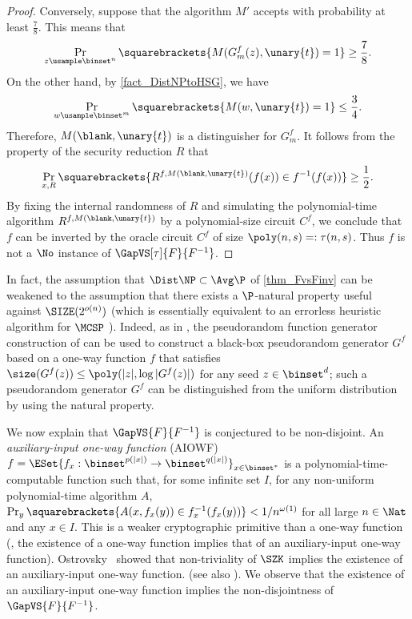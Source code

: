 \documentclass{toc}
\begin{document}
\begin{proof}
  Conversely, suppose that
  the algorithm $M'$ accepts with probability at least $\frac{7}{8}$.
  This means that
  $$
    \Pr_{z \usample \binset^n} \squarebrackets{ M(G^f_{m}(z), \unary{t}) = 1 } \ge \frac{7}{8}.
  $$
  On the other hand, by \cref{fact_DistNPtoHSG}, we have
  $$
    \Pr_{w \usample \binset^m} \squarebrackets{ M(w, \unary{t}) = 1 } \le \frac{3}{4}.
  $$
  Therefore, $M( \blank, \unary{t})$ is a distinguisher for $G_{ m}^f$.
  It follows from the property of the security reduction $R$
  that
  $$
    \Pr_{x, R} \squarebrackets{ R^{f, M(\blank, \unary{t})}(f(x)) \in f^{-1}(f(x)) } \ge \frac{1}{2}.
  $$
  By fixing the internal randomness of $R$ and
  simulating the polynomial-time algorithm $R^{f, M(\blank, \unary{t})}$ by a polynomial-size circuit $C^f$,
  we conclude that $f$ can be inverted by the oracle circuit $C^f$ of size $\poly(n, s) =: \tau(n, s)$.
  Thus $f$ is not a $\No$ instance of $\GapVS[\tau]{F}{F^{-1}}$.
\end{proof}

\begin{remark}
  In fact, the assumption that $\Dist\NP \subset \Avg\P$ of \cref{thm_FvsFinv} can be weakened to
  the assumption that there exists a $\P$-natural property useful against $\SIZE(2^{o(n)})$ (which is essentially equivalent to
  an errorless heuristic algorithm for $\MCSP$ \cite{HiraharaS17_coco_conf,Hirahara18_focs_conf}).
  Indeed,
  as in \cite{AllenderBKMR06_siamcomp_journals,RazborovR97_jcss_journals,AllenderH19_toct_journals},
  the pseudorandom function generator construction of \cite{GoldreichGM86_jacm_journals}
  can be used to construct a black-box pseudorandom generator $G^f$ based on a one-way function $f$
  that satisfies
  $\size(G^f(z)) \le \poly(|z|, \log |G^f(z)|)$ for any seed $z \in \binset^d$;
  such a pseudorandom generator $G^f$ can be distinguished from the uniform distribution by using the natural property.
\end{remark}

We now explain that $\GapVS{F}{F^{-1}}$ is conjectured to be non-disjoint.
An \emph{auxiliary-input one-way function} (AIOWF) $f = \ESet{ f_x : \binset^{p(|x|)} \to \binset^{q(|x|)} }_{x \in \binset^*}$
is
a polynomial-time-computable function such that,
for some infinite set $I$,
for any non-uniform polynomial-time algorithm $A$,
$\Pr_y \squarebrackets{ A(x, f_x(y)) \in f_x^{-1}(f_x(y)) } < 1 / n^{\omega(1)}$ for all large $n \in \Nat$ and any $x \in I$.
This is
a weaker cryptographic primitive than a one-way function (\ie, the existence of a one-way function implies that of an auxiliary-input one-way function).
Ostrovsky~\cite{Ostrovsky91_coco_conf}
showed that non-triviality of $\SZK$ implies the existence of an auxiliary-input one-way function.
(see also \cite{Vadhan06_siamcomp_journals}).
We observe that the existence of an auxiliary-input one-way function implies the non-disjointness of $\GapVS{F}{F^{-1}}$.
\end{document}

